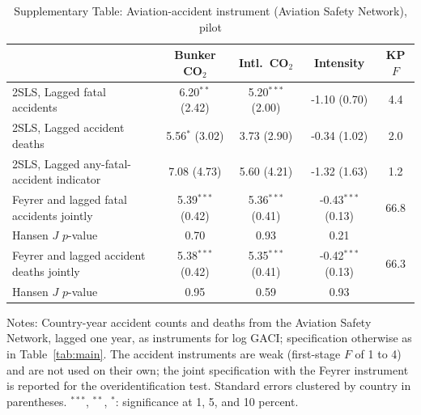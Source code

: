 \begin{table}[htbp]
\centering
\begin{threeparttable}
\caption{Supplementary Table: Aviation-accident instrument (Aviation Safety Network), pilot}
\label{tab:accident_iv}
\footnotesize
\begin{tabular}{lcccc}
\toprule
 & Bunker CO$_2$ & Intl.\ CO$_2$ & Intensity & KP $F$ \\
\midrule
  2SLS, Lagged fatal accidents & 6.20$^{**}$ (2.42) & 5.20$^{***}$ (2.00) & -1.10 (0.70) & 4.4 \\
  2SLS, Lagged accident deaths & 5.56$^{*}$ (3.02) & 3.73 (2.90) & -0.34 (1.02) & 2.0 \\
  2SLS, Lagged any-fatal-accident indicator & 7.08 (4.73) & 5.60 (4.21) & -1.32 (1.63) & 1.2 \\
  Feyrer and lagged fatal accidents jointly & 5.39$^{***}$ (0.42) & 5.36$^{***}$ (0.41) & -0.43$^{***}$ (0.13) & 66.8 \\
  \quad Hansen $J$ $p$-value & 0.70 & 0.93 & 0.21 & \\
  Feyrer and lagged accident deaths jointly & 5.38$^{***}$ (0.42) & 5.35$^{***}$ (0.41) & -0.42$^{***}$ (0.13) & 66.3 \\
  \quad Hansen $J$ $p$-value & 0.95 & 0.59 & 0.93 & \\
\bottomrule
\end{tabular}
\begin{tablenotes}[flushleft]
\footnotesize
\item Notes: Country-year accident counts and deaths from the Aviation Safety Network, lagged one year, as instruments for log GACI; specification otherwise as in Table~\ref{tab:main}. The accident instruments are weak (first-stage $F$ of 1 to 4) and are not used on their own; the joint specification with the Feyrer instrument is reported for the overidentification test. Standard errors clustered by country in parentheses. $^{***}$, $^{**}$, $^{*}$: significance at 1, 5, and 10 percent.
\end{tablenotes}
\end{threeparttable}
\end{table}
